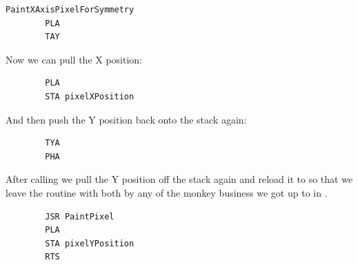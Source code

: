 \begin{lstlisting}
PaintXAxisPixelForSymmetry    
        PLA 
        TAY 
\end{lstlisting}

Now we can pull the X position:
\begin{lstlisting}
        PLA 
        STA pixelXPosition
\end{lstlisting}

And then push the Y position back onto the stack again:
\begin{lstlisting}
        TYA 
        PHA 
\end{lstlisting}

After calling  we pull the Y position off the stack again and reload it to  so that we leave
the routine with both  by any of the monkey business we got up to in .

\begin{lstlisting}
        JSR PaintPixel
        PLA 
        STA pixelYPosition
        RTS 
\end{lstlisting}

\clearpage
\rhead[]{\leftmark}

